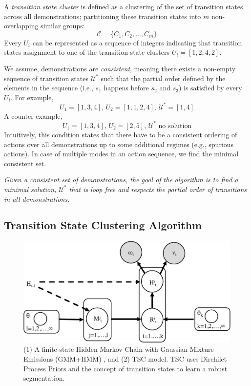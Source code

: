 A \emph{transition state cluster} is
defined as a clustering of the set of transition states across all demonstrations; partitioning these transition states into $m$ non-overlapping similar groups:
\[
\mathcal{C} = \{C_1, C_2,...,C_m\}
\]
Every $U_i$ can be represented as a sequence of integers indicating that transition states assignment to one of the transition state clusters $U_i=[1,2,4,2]$.

We assume, demonstrations are \emph{consistent}, meaning there exists a non-empty sequence of transition states $\mathcal{U}^*$ such that the partial order defined by the elements in the sequence (i.e., $s_1$ happens before $s_2$ and $s_3$) is satisfied by every $U_i$. For example, 
\[U_1 = [1,3,4]\text{, }U_2 = [1,1,2,4]\text{, }\mathcal{U}^*=[1,4] \]
A counter example,
\[U_1 = [1,3,4]\text{, }U_2 = [2,5]\text{, }\mathcal{U}^*\text{  no solution} \]
Intuitively, this condition states that there have to be a consistent ordering of actions over all demonstrations up to some additional regimes (e.g., spurious actions). 
In case of multiple modes in an action sequence, we find the minimal consistent set.


\noindent \emph{Given a consistent set of demonstrations, the goal of the algorithm is to find a minimal solution, $\mathcal{U}^*$ that is loop free and respects the partial order of transitions in all demonstrations.}
\subsection{Transition State Clustering Algorithm}

\begin{figure}[t!]
\centering
\includegraphics[width=\linewidth]{figures/pgm.pdf}
\caption{ (1) A finite-state Hidden Markov Chain with Gaussian Mixture Emissions (GMM+HMM) , and (2) TSC model. TSC uses Dirchilet Process Priors and the concept of transition states to learn a robust segmentation. }
\label{fig:tsc-pgm}
\vspace{-10pt}
\end{figure}


